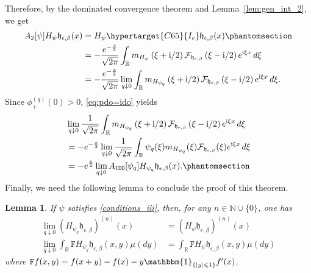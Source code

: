 \documentclass[12pt]{amsart}
\newcommand{\hlabel}{\phantomsection\label}
\newcommand{\hptg}[2]{\hypertarget{#1}{#2}}
\numberwithin{equation}{section}
\newcommand{\bb}{\mathbb}
\newcommand{\cc}{\mathcal}
\renewcommand{\le}{\leqslant}
\newcommand{\mf}{\mathfrak}
\newcommand{\bbm}{\mathbbm}
\newcommand{\ttt}{\mathtt}
\newcommand{\fou}{\mathcal{F}}
\newcommand{\Hpsi}{H_\psi}
\newcommand{\eps}{\epsilon}
\newcommand{\heb}{\mf{h}_{\eps,\beta}}
\renewcommand{\i}{\mathrm{i}}
\newtheorem{lem}[thm]{Lemma}
\theoremstyle{definition}
\theoremstyle{assump}
\theoremstyle{remark}
\begin{document}
{%
Therefore, by the dominated convergence theorem and Lemma~\ref{lem:gen_int_2}, we get
\begin{equation}
\begin{aligned}
A_\ttt{2}[\psi]\Hpsi\heb(x)&=\Hpsi \hptg{C65}{I_e}\heb(x) \hlabel{eq:ido_1} \\
&=-\frac{e^{-\frac{x}{2}}}{\sqrt{2\pi}}\int_\bb{R}m_{\Hpsi}\left(\xi+\i/2\right)\fou_{\heb}\left(\xi-\i/2\right)e^{{\rm{i}}\xi   x}\,d\xi \\
&=-\frac{e^{-\frac{x}{2}}}{\sqrt{2\pi}}\lim_{q\downarrow 0}\int_\bb{R} m_{H_{\psi_q}}\left(\xi+\i/2\right)\fou_{\heb}\left(\xi-\i/2\right)e^{{\rm{i}}\xi   x}\,d\xi.
\end{aligned}
\end{equation}
Since $\phi^{(q)}_+(0)>0$, \eqref{eq:pdo=ido} yields
\begin{equation}
\begin{aligned}
&\lim_{q\downarrow 0}\frac{1}{\sqrt{2\pi}}\int_{\bb{R}}m_{H_{\psi_q}}\left(\xi+\i/2\right)\fou_{\heb}\left(\xi-\i/2\right)e^{{\rm{i}}\xi   x}\,d\xi \\
&=-e^{-\frac{x}{2}}\lim_{q\downarrow 0}\frac{1}{\sqrt{2\pi}}\int_\bb{R}\psi_q(\xi)m_{H_{\psi_q}}(\xi)\fou_{\heb}(\xi) e^{{\rm{i}}\xi   x}\,d\xi \\
&=-e^{\frac{x}{2}}\lim_{q\downarrow 0}A_\ttt{IDO}[\psi_q]H_{\psi_q}\heb(x). \hlabel{eq:ido_2}
\end{aligned}
\end{equation}
Finally, we need the following lemma to conclude the proof of this theorem.
\begin{lem} If $\psi$ satisfies \eqref{conditions_iii}, then, for any $n\in\bb N\cup\{0\}$, one has
\begin{align*}
\lim_{q\downarrow 0}(H_{\psi_q}\heb)^{(n)}(x)&=(\Hpsi\heb)^{(n)}(x) \\
\lim_{q\downarrow 0}\int_\bb{R}\ttt{F}H_{\psi_q}\heb(x,y)\mu(dy)
&=\int_\bb{R}\ttt{F}\Hpsi\heb(x,y)\mu(dy) \nonumber
\end{align*}
where $\ttt{F}f(x,y)=f(x+y)-f(x)-y\bbm{1}_{\{|y|\le 1\}}f'(x)$.
\end{lem}
}
\end{document}
